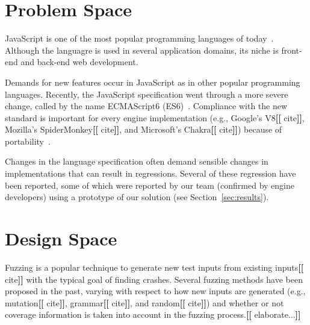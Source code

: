 \documentclass[11pt]{article}
\newcommand{\eg}{e.g.}
\newcommand{\Fix}[1]{\textbf{[[}{\color{red} #1}\textbf{]]}}
\newcommand{\Comment}[1]{}
\begin{document}
\section{Problem Space}

JavaScript is one of the most popular programming languages of
today~\cite{business-insider,stackify}. Although the languagre is used
in several application domains, its niche is front-end and back-end
web development\Comment{, supported several frameworks and runtimes
  (\eg{}, Express.js and Node.js)}.

Demands for new features occur in JavaScript as in other popular
programming languages. Recently, the JavaScript specification went
through a more severe change, called by the name ECMAScript6
(ES6)~\cite{es6-features}. Compliance with the new standard is
important for every engine implementation (\eg{}, Google's
V8\Fix{cite}, Mozilla's SpiderMonkey\Fix{cite}, and Microsoft's
Chakra\Fix{cite}) because of
portability~\cite{kangax}.

\begin{center}
\end{center}

Changes in the language specification often demand sensible changes in
implementations that can result in regressions. Several of these
regression have been reported, some of which were reported by our team
(confirmed by engine developers) using a prototype of our solution
(see Section~\ref{sec:results}).

\section{Design Space}

Fuzzing is a popular technique to generate new test inputs from
existing inputs\Fix{cite} with the typical goal of finding
crashes. Several fuzzing methods have been proposed in the past,
varying with respect to how new inputs are generated (\eg{},
mutation\Fix{cite}, grammar\Fix{cite}, and random\Fix{cite}) and
whether or not coverage information is taken into account in the
fuzzing process.\Fix{elaborate...}
\end{document}
